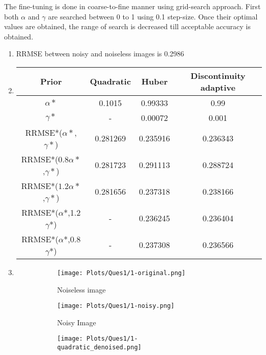\documentclass[11pt]{article}
\begin{document}
\begin{enumerate}
    The fine-tuning is done in coarse-to-fine manner using grid-search approach. First both $\alpha$ and $\gamma$ are searched between 0 to 1 using 0.1 step-size. Once their optimal values are obtained, the range of search is decreased till acceptable accuracy is obtained.
    \begin{enumerate}
        \item RRMSE between noisy and noiseless images is 0.2986
        \item 
        \begin{tabular}{|c|c|c|c|}
            \hline
             Prior & Quadratic & Huber & Discontinuity adaptive  \\
             \hline
             $\alpha*$ & 0.1015 &0.99333 &0.99\\
             \hline
             $\gamma*$ & - &0.00072 &0.001\\
             \hline
            RRMSE*($\alpha*$,$\gamma*$)& 0.281269 &0.235916 & 0.236343\\
            \hline
             RRMSE*($0.8\alpha*$,$\gamma*$)& 0.281723 &0.291113& 0.288724\\
            \hline
             RRMSE*($1.2\alpha*$,$\gamma*$)& 0.281656 &0.237318 & 0.238166\\
            \hline
            RRMSE*($\alpha$*,1.2$\gamma$*)& - &0.236245 & 0.236404\\
            \hline
             RRMSE*($\alpha$*,0.8$\gamma$*)& - &0.237308 & 0.236566\\
             \hline
        \end{tabular}
        \item 
        \begin{figure}[H]
            \centering
            \begin{subfigure}[b]{0.4\textwidth}
                 \centering
                 \texttt{[image: Plots/Ques1/1-original.png]}
                 \caption{Noiseless image}
            \end{subfigure}
            \begin{subfigure}[b]{0.4\textwidth}
                 \centering
                 \texttt{[image: Plots/Ques1/1-noisy.png]}
                 \caption{Noisy Image}
            \end{subfigure}
            \begin{subfigure}[b]{0.4\textwidth}
                 \centering
                 \texttt{[image: Plots/Ques1/1-quadratic\_denoised.png]}

\end{subfigure}
\end{figure}
\end{enumerate}
\end{enumerate}
\end{document}
